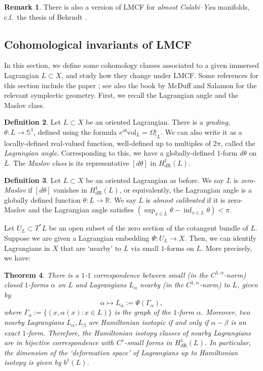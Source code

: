 \documentclass[10pt, a4paper]{article}
\theoremstyle{plain}%
\newtheorem{theorem}{Theorem}[section]
\theoremstyle{definition}
\newtheorem{defn}[theorem]{Definition}
\newtheorem{rem}[theorem]{Remark}
\numberwithin{figure}{section}
\numberwithin{equation}{section}
\newcommand{\bR}{\mathbb{R}}
\newcommand{\rt}{\rightarrow}
\begin{document}
\begin{rem}
    There is also a version of LMCF for \textit{almost Calabi--Yau} manifolds, c.f.\ the thesis of Behrndt \cite{Beh11}.
\end{rem}




\subsection{Cohomological invariants of LMCF}
In this section, we define some cohomology classes associated to a given immersed Lagrangian $L\subset  X$, and study how they change under LMCF. Some references for this section include the paper \cite{TY02}; see also the book by McDuff and Salamon \cite{MS98} for the relevant symplectic geometry. First, we recall the Lagrangian angle and the Maslov class.
\begin{defn}
	Let $L\subset X$ be an oriented Lagrangian. There is a \textit{grading}, $\theta: L \rightarrow \mathbb{S}^1$, defined using the formula $e^{i\theta}\mathrm{vol}_L= \Omega|_L$. We can also write it as a locally-defined real-valued function, well-defined up to multiples of $2\pi$, called the \textit{Lagrangian angle}. Corresponding to this, we have a globally-defined $1$-form $d\theta$ on $L$. The \textit{Maslov class} is its representative $[d\theta]$ in $H^1_{\mathrm{dR}}(L)$.
\end{defn}
\begin{defn}
    Let $L\subset X$ be an oriented Lagrangian as before. We say $L$ is \textit{zero-Maslov} if $[d\theta]$ vanishes in $H^1_{\mathrm{dR}}(L)$, or equivalently, the Lagrangian angle is a globally defined function $\theta: L\rt \bR$. We say $L$ is \textit{almost calibrated} if it is zero-Maslov and the Lagrangian angle satisfies $(\sup_{x\in L} \theta -\inf_{x\in L}\theta) < \pi$. 
\end{defn}


Let $U_L\subset T^*L$ be an open subset of the zero section of the cotangent bundle of $L$. 
Suppose we are given a Lagrangian embedding $\Psi: U_L \rightarrow X$. Then, we can identify Lagrangians in $X$ that are `nearby' to $L$ via small $1$-forms on $L$. More precisely, we have:  
\begin{theorem}
	There is a $1$-$1$ correspondence between small (in the $C^{1,\alpha}$-norm) closed $1$-forms $\alpha$ on $L$ and Lagrangians $L_\alpha$ nearby (in the $C^{1,\alpha}$-norm) to $L$, given by \[
	\alpha \mapsto L_\alpha:=\Psi(\Gamma_\alpha),
	\] 
	where $\Gamma_\alpha:=\{(x,\alpha(x) : x\in L)\}$ is the graph of the $1$-form $\alpha$.
	Moreover, two nearby Lagrangians $L_\alpha,L_\beta$ are Hamiltonian isotopic if and only if $\alpha-\beta$ is an exact $1$-form. Therefore, the Hamiltonian isotopy classes of nearby Lagrangians are in bijective correspondence with $C^1$-small forms in $H_{\mathrm{dR}}^1(L)$. In particular, the dimension of the `deformation space' of Lagrangians up to Hamiltonian isotopy is given by $b^1(L)$. 
\end{theorem}
\end{document}
